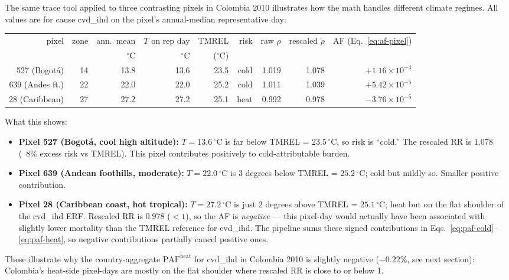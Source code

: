 \documentclass[11pt]{article}
\newcommand{\PAF}{\text{PAF}}
\begin{document}
The same trace tool applied to three contrasting pixels in Colombia 2010
illustrates how the math handles different climate regimes. All values
are for cause cvd\_ihd on the pixel's annual-median representative day:

\begin{center}
\small
\begin{tabular}{r r r r r r r r r}
\toprule
pixel & zone & ann.\ mean & $T$ on rep day & TMREL & risk & raw $\rho$ & rescaled $\tilde\rho$ & AF (Eq.\ \ref{eq:af-pixel}) \\
& & $^{\circ}$C & $^{\circ}$C & ($^{\circ}$C) & & & & \\
\midrule
527 (Bogotá) & 14 & 13.8 & 13.6 & 23.5 & cold & 1.019 & 1.078 & $+1.16\!\times\!10^{-4}$ \\
639 (Andes ft.) & 22 & 22.0 & 22.0 & 25.2 & cold & 1.011 & 1.039 & $+5.42\!\times\!10^{-5}$ \\
28 (Caribbean) & 27 & 27.2 & 27.2 & 25.1 & heat & 0.992 & 0.978 & $-3.76\!\times\!10^{-5}$ \\
\bottomrule
\end{tabular}
\end{center}

What this shows:
\begin{itemize}[itemsep=2pt]
  \item \textbf{Pixel 527 (Bogotá, cool high altitude):} $T = 13.6\,^{\circ}$C
    is far below TMREL = $23.5\,^{\circ}$C, so risk is ``cold.'' The
    rescaled RR is 1.078 (~8\% excess risk vs TMREL). This pixel
    contributes positively to cold-attributable burden.
  \item \textbf{Pixel 639 (Andean foothills, moderate):} $T = 22.0\,^{\circ}$C
    is 3 degrees below TMREL = $25.2\,^{\circ}$C; cold but mildly so.
    Smaller positive contribution.
  \item \textbf{Pixel 28 (Caribbean coast, hot tropical):} $T = 27.2\,^{\circ}$C
    is just 2 degrees above TMREL = $25.1\,^{\circ}$C; heat but on the
    flat shoulder of the cvd\_ihd ERF. Rescaled RR is 0.978 ($<1$), so
    the AF is \emph{negative} --- this pixel-day would actually have
    been associated with slightly lower mortality than the TMREL
    reference for cvd\_ihd. The pipeline sums these signed contributions
    in Eqs.~\eqref{eq:paf-cold}--\eqref{eq:paf-heat}, so negative
    contributions partially cancel positive ones.
\end{itemize}

These illustrate why the country-aggregate $\PAF^{\text{heat}}$ for
cvd\_ihd in Colombia 2010 is slightly negative ($-0.22\%$, see next
section): Colombia's heat-side pixel-days are mostly on the flat
shoulder where rescaled RR is close to or below 1.
\end{document}

